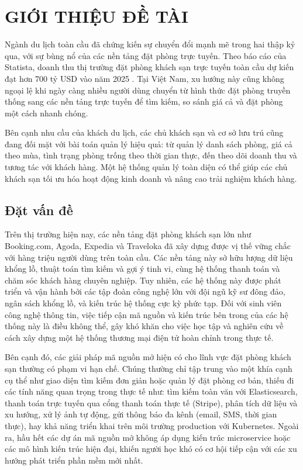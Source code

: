 \documentclass[13pt,a4paper,twoside]{report}
\begin{document}
\chapter{GIỚI THIỆU ĐỀ TÀI}

Ngành du lịch toàn cầu đã chứng kiến sự chuyển đổi mạnh mẽ trong hai thập kỷ qua, với sự bùng nổ của các nền tảng đặt phòng trực tuyến. Theo báo cáo của Statista, doanh thu thị trường đặt phòng khách sạn trực tuyến toàn cầu dự kiến đạt hơn 700 tỷ USD vào năm 2025 \cite{booking2025statista}. Tại Việt Nam, xu hướng này cũng không ngoại lệ khi ngày càng nhiều người dùng chuyển từ hình thức đặt phòng truyền thống sang các nền tảng trực tuyến để tìm kiếm, so sánh giá cả và đặt phòng một cách nhanh chóng.

Bên cạnh nhu cầu của khách du lịch, các chủ khách sạn và cơ sở lưu trú cũng đang đối mặt với bài toán quản lý hiệu quả: từ quản lý danh sách phòng, giá cả theo mùa, tình trạng phòng trống theo thời gian thực, đến theo dõi doanh thu và tương tác với khách hàng. Một hệ thống quản lý toàn diện có thể giúp các chủ khách sạn tối ưu hóa hoạt động kinh doanh và nâng cao trải nghiệm khách hàng.

\section{Đặt vấn đề}

Trên thị trường hiện nay, các nền tảng đặt phòng khách sạn lớn như Booking.com, Agoda, Expedia và Traveloka đã xây dựng được vị thế vững chắc với hàng triệu người dùng trên toàn cầu. Các nền tảng này sở hữu lượng dữ liệu khổng lồ, thuật toán tìm kiếm và gợi ý tinh vi, cùng hệ thống thanh toán và chăm sóc khách hàng chuyên nghiệp. Tuy nhiên, các hệ thống này được phát triển và vận hành bởi các tập đoàn công nghệ lớn với đội ngũ kỹ sư đông đảo, ngân sách khổng lồ, và kiến trúc hệ thống cực kỳ phức tạp. Đối với sinh viên công nghệ thông tin, việc tiếp cận mã nguồn và kiến trúc bên trong của các hệ thống này là điều không thể, gây khó khăn cho việc học tập và nghiên cứu về cách xây dựng một hệ thống thương mại điện tử hoàn chỉnh trong thực tế.

Bên cạnh đó, các giải pháp mã nguồn mở hiện có cho lĩnh vực đặt phòng khách sạn thường có phạm vi hạn chế. Chúng thường chỉ tập trung vào một khía cạnh cụ thể như giao diện tìm kiếm đơn giản hoặc quản lý đặt phòng cơ bản, thiếu đi các tính năng quan trọng trong thực tế như: tìm kiếm toàn văn với Elasticsearch, thanh toán trực tuyến qua cổng thanh toán thực tế (Stripe), phân tích dữ liệu và xu hướng, xử lý ảnh tự động, gửi thông báo đa kênh (email, SMS, thời gian thực), hay khả năng triển khai trên môi trường production với Kubernetes. Ngoài ra, hầu hết các dự án mã nguồn mở không áp dụng kiến trúc microservice hoặc các mô hình kiến trúc hiện đại, khiến người học khó có cơ hội tiếp cận với các xu hướng phát triển phần mềm mới nhất.
\end{document}
